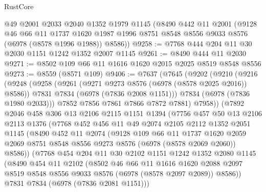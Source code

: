 \begin{lexlean}{RustCore}
\begin{coremodule}
    @49
    @2001
    @2033
    @2040
    @1352
    @1979
    @1145
    (@8490
      @442
      @11
      @2001
      (@9128
        @46
        @66
        @11
        @1737
        @1620
        @1987
        @1996
        @8751
        @8548
        @8556
        @9033
        @8576
        (@6978 (@8578 @1996 @1988))
        @8586))
@9258 := @7768 @444 @204 @11 @30 @2030 @1151 @1242 @1352 @2007 @1145
@9261 := @8490 @444 @11 @2030
@9271 := @8502 @109 @66 @11 @1616 @1620 @2015 @2025 @8519 @8548 @8556
@9273 := @8559 (@8571 @109)
@9406 := @7637
    (@7645
      (@9202
        (@9210
          (@9216
            (@9248
              (@9258
                (@9261 (@9271 @9273 @8576 (@6978 (@8578 @2025 @2016)) @8586))
                @7831
                @7834
                (@6978 (@7836 @2008 @1151)))
              @7834
              (@6978 (@7836 @1980 @2033)))
            @7852
            @7856
            @7861
            @7866
            @7872
            @7881)
          @7958))
      (@7892
        @2046
        @458
        @306
        @13
        @2106
        @2115
        @1151
        @1394
        (@7756
          @457
          @50
          @13
          @2106
          @2113
          @1376
          (@7768
            @452
            @456
            @11
            @49
            @2074
            @2105
            @2112
            @1352
            @2051
            @1145
            (@8490
              @452
              @11
              @2074
              (@9128
                @109
                @66
                @11
                @1737
                @1620
                @2059
                @2069
                @8751
                @8548
                @8556
                @9273
                @8576
                (@6978 (@8578 @2069 @2060))
                @8586))
            (@7768
              @454
              @204
              @11
              @30
              @2102
              @1151
              @1242
              @1352
              @2080
              @1145
              (@8490
                @454
                @11
                @2102
                (@8502
                  @46
                  @66
                  @11
                  @1616
                  @1620
                  @2088
                  @2097
                  @8519
                  @8548
                  @8556
                  @9033
                  @8576
                  (@6978 (@8578 @2097 @2089))
                  @8586))
              @7831
              @7834
              (@6978 (@7836 @2081 @1151)))

\end{coremodule}
\end{lexlean}
